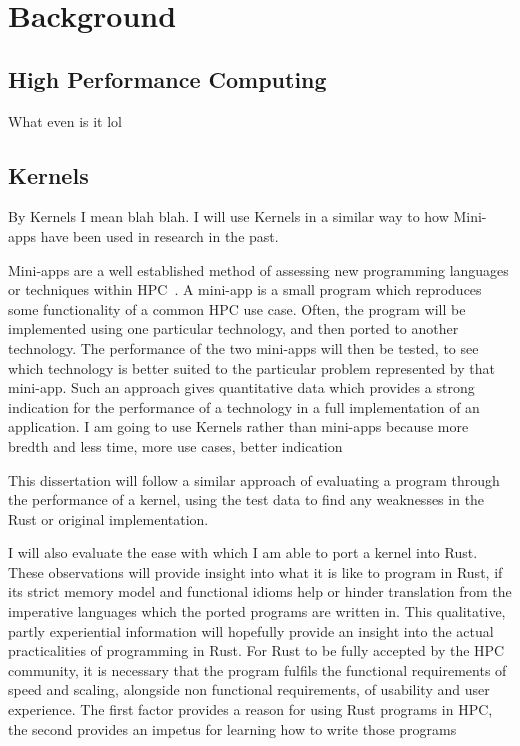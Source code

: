 \chapter{Background}
\section{High Performance Computing}
What even is it lol

\section{Kernels}
By Kernels I mean blah blah. I will use Kernels in a similar way to how Mini-apps have been used in research in the past.

Mini-apps are a well established method of assessing new programming languages or techniques within HPC~\cite{Mallinson:2014, Slaughter:2015, martineau2017arch}. A mini-app is a small program which reproduces some functionality of a common HPC use case. Often, the program will be implemented using one particular technology, and then ported to another technology. The performance of the two mini-apps will then be tested, to see which technology is better suited to the particular problem represented by that mini-app. Such an approach gives quantitative data which provides a strong indication for the performance of a technology in a full implementation of an application. I am going to use Kernels rather than mini-apps because more bredth and less time, more use cases, better indication

This dissertation will follow a similar approach of evaluating a program through the performance of a kernel, using the test data to find any weaknesses in the Rust or original implementation.

I will also evaluate the ease with which I am able to port a kernel into Rust. These observations will provide insight into what it is like to program in Rust, if its strict memory model and functional idioms help or hinder translation from the imperative languages which the ported programs are written in. This qualitative, partly experiential information will hopefully provide an insight into the actual practicalities of programming in Rust. For Rust to be fully accepted by the HPC community, it is necessary that the program fulfils the functional requirements of speed and scaling, alongside non functional requirements, of usability and user experience. The first factor provides a reason for using Rust programs in HPC, the second provides an impetus for learning how to write those programs


